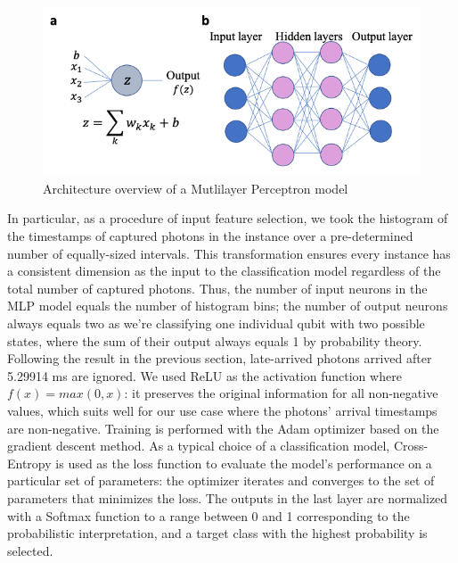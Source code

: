 \documentclass[letterpaper,twocolumn,10pt]{article}
\begin{document}
\begin{figure}
    \includegraphics[width=\linewidth]{Figures/mlp_architecture.png}
    \centering
    \caption{Architecture overview of a Mutlilayer Perceptron model}
    \label{fig:mlp_architecture}
\end{figure}

In particular, as a procedure of input feature selection, we took the histogram of the timestamps of captured photons in the instance over a pre-determined number of equally-sized intervals. This transformation ensures every instance has a consistent dimension as the input to the classification model regardless of the total number of captured photons. Thus, the number of input neurons in the MLP model equals the number of histogram bins; the number of output neurons always equals two as we're classifying one individual qubit with two possible states, where the sum of their output always equals 1 by probability theory. Following the result in the previous section, late-arrived photons arrived after 5.29914 ms are ignored. We used ReLU as the activation function where $f(x) = max(0, x)$: it preserves the original information for all non-negative values, which suits well for our use case where the photons' arrival timestamps are non-negative. Training is performed with the Adam optimizer based on the gradient descent method. As a typical choice of a classification model, Cross-Entropy is used as the loss function to evaluate the model's performance on a particular set of parameters: the optimizer iterates and converges to the set of parameters that minimizes the loss. The outputs in the last layer are normalized with a Softmax function to a range between 0 and 1 corresponding to the probabilistic interpretation, and a target class with the highest probability is selected.
\end{document}
